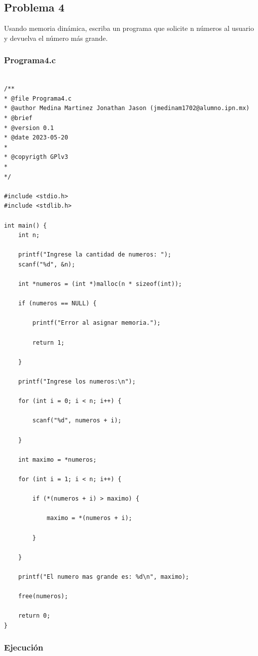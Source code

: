 \documentclass{article}
\begin{document}
	\subsection{Problema 4}
	
	Usando memoria dinámica, escriba un programa que solicite n números al usuario y devuelva el número más grande.
	
	\subsubsection{Programa4.c}
	
	\begin{lstlisting}

/**
* @file Programa4.c
* @author Medina Martinez Jonathan Jason (jmedinam1702@alumno.ipn.mx)
* @brief 
* @version 0.1
* @date 2023-05-20
* 
* @copyrigth GPlv3
* 
*/

#include <stdio.h>
#include <stdlib.h>

int main() {
	int n;
	
	printf("Ingrese la cantidad de numeros: ");
	scanf("%d", &n);
	
	int *numeros = (int *)malloc(n * sizeof(int));
	
	if (numeros == NULL) {
		
		printf("Error al asignar memoria.");
		
		return 1;
		
	}
	
	printf("Ingrese los numeros:\n");
	
	for (int i = 0; i < n; i++) {
		
		scanf("%d", numeros + i);
		
	}
	
	int maximo = *numeros;
	
	for (int i = 1; i < n; i++) {
		
		if (*(numeros + i) > maximo) {
			
			maximo = *(numeros + i);
			
		}
		
	}
	
	printf("El numero mas grande es: %d\n", maximo);
	
	free(numeros);
	
	return 0;
}
	\end{lstlisting}
	
	\subsubsection{Ejecución}
	
\end{document}
